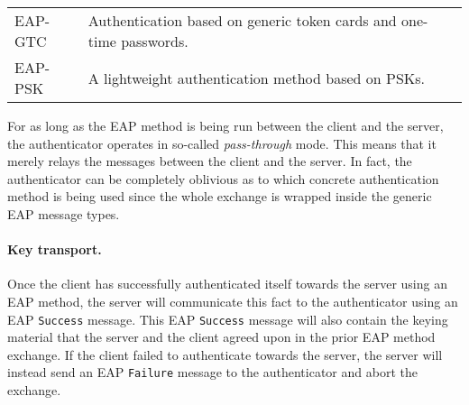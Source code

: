 \begin{table}
\begin{tabular}{l p{9cm} l}
		EAP-GTC & Authentication based on generic token cards and one-time passwords. & \cite{IETF:RFC3748:EAP} \\
		
		EAP-PSK & A lightweight authentication method based on PSKs.  & \cite{IETF:RFC4764:EAP-PSK} \\
		
%		
			
		\bottomrule
	\end{tabular}
		
%	
	


\end{table}


For as long as the EAP method is being run between the client and the server,
the authenticator operates in so-called \emph{pass-through} mode.
This means that it merely relays the messages between the client and the server.
In fact,
the authenticator can be completely oblivious as to which concrete authentication method is being used since the whole exchange is wrapped inside the generic EAP message types.    


\paragraph{Key transport.}
Once the client has successfully authenticated itself towards the server using an EAP method,
the server will communicate this fact to the authenticator using an EAP \texttt{Success} message.
This EAP \texttt{Success} message will also contain the keying material that the server and the client agreed upon in the prior EAP method exchange.
If the client failed to authenticate towards the server,
the server will instead send an EAP \texttt{Failure} message to the authenticator and abort the exchange.

